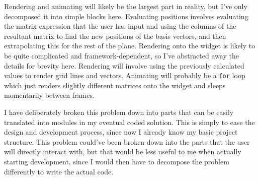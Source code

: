 \documentclass[../main.tex]{subfiles}
\begin{document}
Rendering and animating will likely be the largest part in reality, but I've only decomposed it into simple blocks here. Evaluating positions involves evaluating the matrix expression that the user has input and using the columns of the resultant matrix to find the new positions of the basis vectors, and then extrapolating this for the rest of the plane. Rendering onto the widget is likely to be quite complicated and framework-dependent, so I've abstracted away the details for brevity here. Rendering will involve using the previously calculated values to render grid lines and vectors. Animating will probably be a \texttt{for} loop which just renders slightly different matrices onto the widget and sleeps momentarily between frames.

I have deliberately broken this problem down into parts that can be easily translated into modules in my eventual coded solution. This is simply to ease the design and development process, since now I already know my basic project structure. This problem could've been broken down into the parts that the user will directly interact with, but that would be less useful to me when actually starting development, since I would then have to decompose the problem differently to write the actual code.
\end{document}
